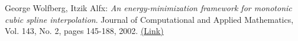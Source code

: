 \begin{thebibliography}{99}

 George Wolfberg, Itzik Alfx: \textit{An energy-minimization framework for monotonic cubic spline interpolation}. Journal of Computational and Applied Mathematics, Vol. 143, No. 2, pages 145-188, 2002. \href{https://www.sciencedirect.com/science/article/pii/S0377042701005064}{(\underline{Link})}

\end{thebibliography}